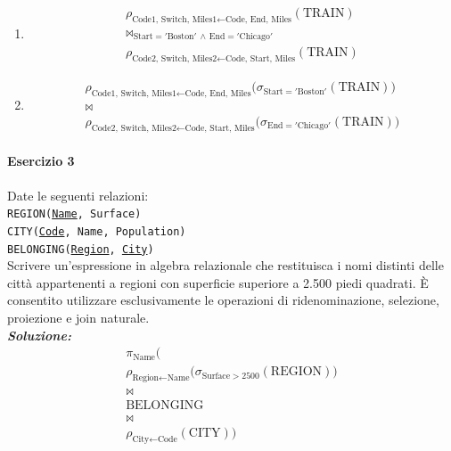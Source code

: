 \documentclass[12pt]{extarticle}
\begin{document}
\begin{enumerate}
    \item %
        \[
        \begin{gathered}
        \rho_{\text{Code1, Switch, Miles1} \leftarrow \text{Code, End, Miles}}(\text{TRAIN}) \\
        \bowtie_{\text{Start} = '\text{Boston}' \,\land\, \text{End} = '\text{Chicago}'} \\
        \rho_{\text{Code2, Switch, Miles2} \leftarrow \text{Code, Start, Miles}}(\text{TRAIN})
        \end{gathered}
        \]

    \item
        \[
        \begin{gathered}
        \rho_{\text{Code1, Switch, Miles1} \leftarrow \text{Code, End, Miles}} \big( \sigma_{\text{Start} = '\text{Boston}'}(\text{TRAIN}) \big) \\
        \bowtie \\
        \rho_{\text{Code2, Switch, Miles2} \leftarrow \text{Code, Start, Miles}} \big( \sigma_{\text{End} = '\text{Chicago}'}(\text{TRAIN}) \big)
        \end{gathered}
        \]
\end{enumerate}

\paragraph{Esercizio 3} Date le seguenti relazioni:\\

\noindent \texttt{REGION(\underline{Name}, Surface)}\\
\texttt{CITY(\underline{Code}, Name, Population)}\\
\texttt{BELONGING(\underline{Region}, \underline{City})}\\[0.5em]

\noindent Scrivere un'espressione in algebra relazionale che restituisca i nomi distinti delle città appartenenti a regioni con superficie superiore a 2.500 piedi quadrati. È consentito utilizzare esclusivamente le operazioni di ridenominazione, selezione, proiezione e join naturale.\\

\noindent \textbf{\textit{Soluzione:}}
\[
\begin{gathered}
\pi_{\text{Name}} \Big( \\
\rho_{\text{Region} \leftarrow \text{Name}} \big( \sigma_{\text{Surface} > 2500}(\text{REGION}) \big) \\
\bowtie \\
\text{BELONGING} \\
\bowtie \\
\rho_{\text{City} \leftarrow \text{Code}}(\text{CITY}) \Big)
\end{gathered}
\]
\end{document}
